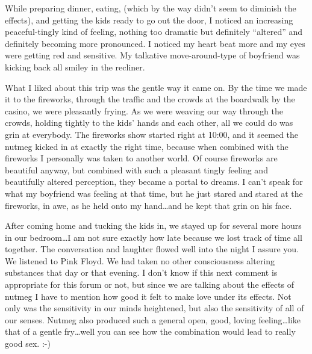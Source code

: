 \documentclass[letterpaper,12pt]{article}
\begin{document}
While preparing dinner, eating, (which by the way didn't seem to diminish the effects), and getting the kids ready to go out the door, I noticed an increasing peaceful-tingly kind of feeling, nothing too dramatic but definitely ``altered'' and definitely becoming more pronounced. I noticed my heart beat more and my eyes were getting red and sensitive. My talkative move-around-type of boyfriend was kicking back all smiley in the recliner.



What I liked about this trip was the gentle way it came on.  By the time we made it to the fireworks, through the traffic and the crowds at the boardwalk by the casino, we were pleasantly frying.  As we were weaving our way through the crowds, holding tightly to the kids' hands and each other, all we could do was grin at everybody. The fireworks show started right at 10:00, and it seemed the nutmeg kicked in at exactly the right time, because when combined with the fireworks I personally was taken to another world.  Of course fireworks are beautiful anyway, but combined with such a pleasant tingly feeling and beautifully altered perception, they became a portal to dreams. I can't speak for what my boyfriend was feeling at that time, but he just stared and stared at the fireworks, in awe, as he held onto my hand\ldots and he kept that grin on his face.



After coming home and tucking the kids in, we stayed up for several more hours in our bedroom\ldots I am not sure exactly how late because we lost track of time all together. The conversation and laughter flowed well into the night I assure you. We listened to Pink Floyd.  We had taken no other consciousness altering substances that day or that evening.  I don't know if this next comment is appropriate for this forum or not, but since we are talking about the effects of nutmeg I have to mention how good it felt to make love under its effects.  Not only was the sensitivity in our minds heightened, but also the sensitivity of all of our senses.  Nutmeg also produced such a general open, good, loving feeling\ldots like that of a gentle fry\ldots well you can see how the combination would lead to really good sex.  :-)
\end{document}
